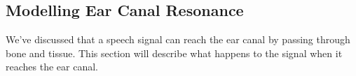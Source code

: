 % 
% 
% 
% 

\subsection{Modelling Ear Canal Resonance}
We've discussed that a speech signal can reach the ear canal by passing through bone and tissue.  This section will describe what happens to the signal when it reaches the ear canal. 

